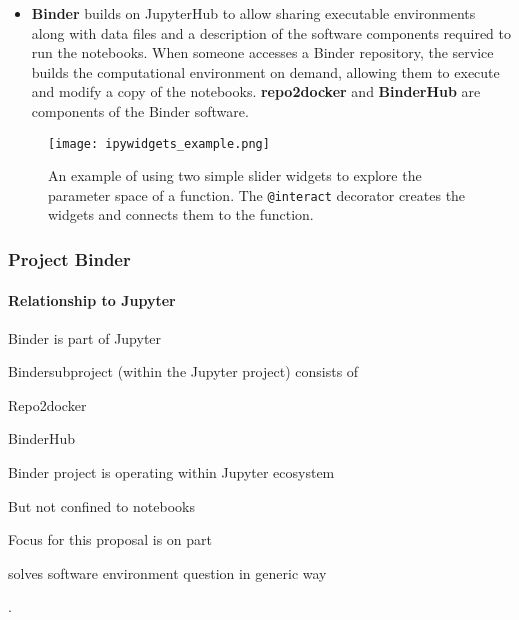 \begin{itemize}
  \item \textbf{Binder} builds on JupyterHub to allow sharing executable
  environments along with data files and a description of the software components
  required to run the notebooks. When someone accesses a Binder repository,
  the service builds the computational environment on demand, allowing them to
  execute and modify a copy of the notebooks.
  \textbf{repo2docker} \cite{repo2docker} and \textbf{BinderHub} \cite{binder} are components of the Binder
  software. 
\end{itemize}

\begin{figure}[ht]\centering
  \texttt{[image: ipywidgets\_example.png]}
  \caption{An example of using two simple slider widgets to explore the
  parameter space of a function. The \texttt{@interact} decorator creates
  the widgets and connects them to the function.}
  \label{fig:ipywidgets-example}
\end{figure}


\subsubsection{Project Binder}


\paragraph{Relationship to Jupyter}
\begin{compactitem}
\item Binder is part of Jupyter
\item Bindersubproject (within the Jupyter project) consists of
\begin{compactitem}
\item Repo2docker
\item BinderHub
\end{compactitem}
\item Binder project is operating within Jupyter ecosystem
\item But not confined to notebooks
\item Focus for this proposal is on \repotodocker{} part
\item \repotodocker{} solves software environment question in generic way
\end{compactitem}
.

